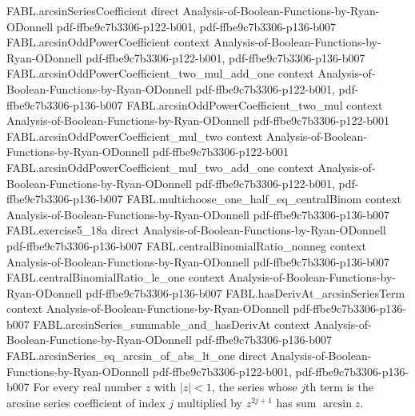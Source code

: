 \begin{lemma}
\label{FABL.arcsinSeries_hasSum_of_abs_lt_one}
\leanok
{}
\proofstep
  {FABL.arcsinSeriesCoefficient}
  {direct}
  {Analysis-of-Boolean-Functions-by-Ryan-ODonnell}
  {pdf-ffbe9c7b3306-p122-b001,
    pdf-ffbe9c7b3306-p136-b007}
\proofstep
  {FABL.arcsinOddPowerCoefficient}
  {context}
  {Analysis-of-Boolean-Functions-by-Ryan-ODonnell}
  {pdf-ffbe9c7b3306-p122-b001,
    pdf-ffbe9c7b3306-p136-b007}
\proofstep
  {FABL.arcsinOddPowerCoefficient_two_mul_add_one}
  {context}
  {Analysis-of-Boolean-Functions-by-Ryan-ODonnell}
  {pdf-ffbe9c7b3306-p122-b001,
    pdf-ffbe9c7b3306-p136-b007}
\proofstep
  {FABL.arcsinOddPowerCoefficient_two_mul}
  {context}
  {Analysis-of-Boolean-Functions-by-Ryan-ODonnell}
  {pdf-ffbe9c7b3306-p122-b001}
\proofstep
  {FABL.arcsinOddPowerCoefficient_mul_two}
  {context}
  {Analysis-of-Boolean-Functions-by-Ryan-ODonnell}
  {pdf-ffbe9c7b3306-p122-b001}
\proofstep
  {FABL.arcsinOddPowerCoefficient_mul_two_add_one}
  {context}
  {Analysis-of-Boolean-Functions-by-Ryan-ODonnell}
  {pdf-ffbe9c7b3306-p122-b001,
    pdf-ffbe9c7b3306-p136-b007}
\proofstep
  {FABL.multichoose_one_half_eq_centralBinom}
  {context}
  {Analysis-of-Boolean-Functions-by-Ryan-ODonnell}
  {pdf-ffbe9c7b3306-p136-b007}
\proofstep
  {FABL.exercise5_18a}
  {direct}
  {Analysis-of-Boolean-Functions-by-Ryan-ODonnell}
  {pdf-ffbe9c7b3306-p136-b007}
\proofstep
  {FABL.centralBinomialRatio_nonneg}
  {context}
  {Analysis-of-Boolean-Functions-by-Ryan-ODonnell}
  {pdf-ffbe9c7b3306-p136-b007}
\proofstep
  {FABL.centralBinomialRatio_le_one}
  {context}
  {Analysis-of-Boolean-Functions-by-Ryan-ODonnell}
  {pdf-ffbe9c7b3306-p136-b007}
\proofstep
  {FABL.hasDerivAt_arcsinSeriesTerm}
  {context}
  {Analysis-of-Boolean-Functions-by-Ryan-ODonnell}
  {pdf-ffbe9c7b3306-p136-b007}
\proofstep
  {FABL.arcsinSeries_summable_and_hasDerivAt}
  {context}
  {Analysis-of-Boolean-Functions-by-Ryan-ODonnell}
  {pdf-ffbe9c7b3306-p136-b007}
\proofstep
  {FABL.arcsinSeries_eq_arcsin_of_abs_lt_one}
  {direct}
  {Analysis-of-Boolean-Functions-by-Ryan-ODonnell}
  {pdf-ffbe9c7b3306-p122-b001,
    pdf-ffbe9c7b3306-p136-b007}
For every real number $z$ with $|z|<1$, the series whose $j$th term is the arcsine
series coefficient of index $j$ multiplied by $z^{2j+1}$ has sum $\arcsin z$.
\end{lemma}


